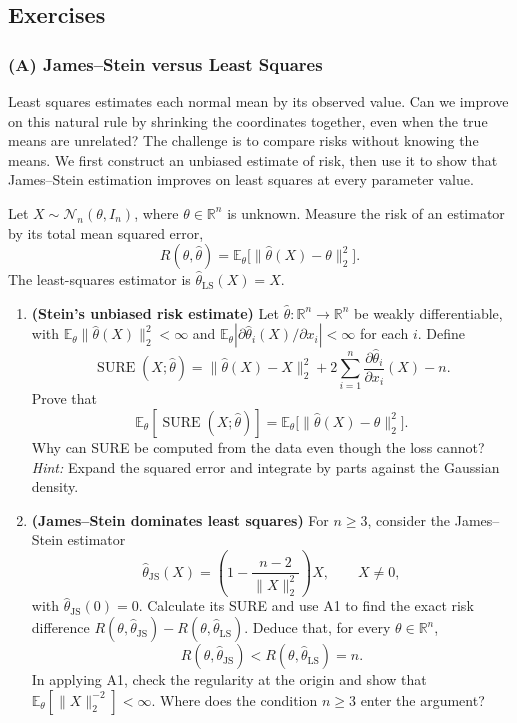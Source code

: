 \clearpage
\subsection{Exercises}
\label{sec:parameter-estimation-exercises}

\subsubsection*{(A) James--Stein versus Least Squares}
{}
\label{ex:james-stein}

Least squares estimates each normal mean by its observed value. Can we improve on this natural rule
by shrinking the coordinates together, even when the true means are unrelated? The challenge is to
compare risks without knowing the means. We first construct an unbiased estimate of risk, then use it to
show that James--Stein estimation improves on least squares at every parameter value.

Let $X\sim\mathcal N_n(\theta,I_n)$, where $\theta\in\mathbb R^n$ is unknown. Measure the risk of an estimator by its total mean squared error,
\[
 R(\theta,\hat\theta)=\mathbb E_\theta\bigl[\|\hat\theta(X)-\theta\|_2^2\bigr].
\]
The least-squares estimator is $\hat\theta_{\mathrm{LS}}(X)=X$.

\begin{enumerate}[label=\textcolor{AccentInk}{\sffamily\bfseries A\arabic*.},ref=A\arabic*,leftmargin=2.65em,labelsep=0.65em,itemsep=1em]
\item \textbf{(Stein's unbiased risk estimate)} Let $\hat\theta:\mathbb R^n\to\mathbb R^n$ be weakly differentiable, with $\mathbb E_\theta\|\hat\theta(X)\|_2^2<\infty$ and $\mathbb E_\theta|\partial\hat\theta_i(X)/\partial x_i|<\infty$ for each $i$. Define
\[
 \operatorname{SURE}(X;\hat\theta)=\|\hat\theta(X)-X\|_2^2+2\sum_{i=1}^n\frac{\partial\hat\theta_i}{\partial x_i}(X)-n.
\]
Prove that
\[
 \mathbb E_\theta[\operatorname{SURE}(X;\hat\theta)]=\mathbb E_\theta\bigl[\|\hat\theta(X)-\theta\|_2^2\bigr].
\]
Why can SURE be computed from the data even though the loss cannot? \emph{Hint:} Expand the squared error and integrate by parts against the Gaussian density.

\item \textbf{(James--Stein dominates least squares)} For $n\ge3$, consider the James--Stein estimator
\[
 \hat\theta_{\mathrm{JS}}(X)=\left(1-\frac{n-2}{\|X\|_2^2}\right)X,\qquad X\ne0,
\]
with $\hat\theta_{\mathrm{JS}}(0)=0$. Calculate its SURE and use A1 to find the exact risk difference $R(\theta,\hat\theta_{\mathrm{JS}})-R(\theta,\hat\theta_{\mathrm{LS}})$. Deduce that, for every $\theta\in\mathbb R^n$,
\[
 R(\theta,\hat\theta_{\mathrm{JS}})<R(\theta,\hat\theta_{\mathrm{LS}})=n.
\]
In applying A1, check the regularity at the origin and show that $\mathbb E_\theta[\|X\|_2^{-2}]<\infty$. Where does the condition $n\ge3$ enter the argument?
\end{enumerate}

